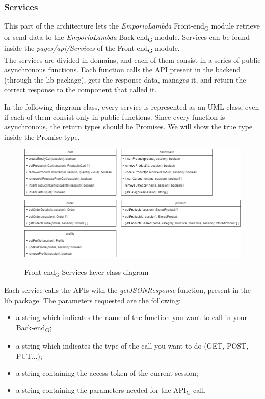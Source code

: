 \subsubsection{Services}
This part of the architecture lets the \textit{EmporioLambda} Front-end\textsubscript{G} module retrieve or send data to the \textit{EmporioLambda} Back-end\textsubscript{G} module. Services can be found inside the \textit{pages/api/Services} of the Front-end\textsubscript{G} module.\\

The services are divided in domains, and each of them consist in a series of public asynchronous functions. Each function calls the API present in the backend (through the lib package), gets the response data, manages it, and return the correct response to the component that called it.

In the following diagram class, every service is represented as an UML class, even if each of them consist only in public functions. Since every function is asynchronous, the return types should be Promises. We will show the true type inside the Promise type.

\begin{figure}[H]
\centering
\includegraphics[scale=0.50]{res/Architettura/Frontend/img/services_frontend_class}\\
\caption{Front-end\textsubscript{G} Services layer class diagram}
\end{figure}


Each service calls the APIs with the \textit{getJSONResponse} function, present in the lib package. The parameters requested are the following:

\begin{itemize}
\item a string which indicates the name of the function you want to call in your Back-end\textsubscript{G}; 
\item a string which indicates the type of the call you want to do (GET, POST, PUT...);
\item a string containing the access token of the current session; 
\item a string containing the parameters needed for the API\textsubscript{G} call. 
\end{itemize} 


